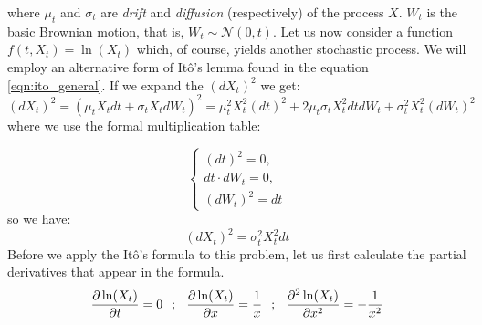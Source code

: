 \documentclass[times, utf8, diplomski]{fer}
\begin{document}
\noindent where $\mu_t$ and $\sigma_t$ are \textit{drift} and \textit{diffusion} (respectively) of the process $X$. $W_t$ is the basic Brownian motion, that is, $W_t \sim \mathcal{N}(0,t)$. Let us now consider a function $f(t,X_t) = \ln(X_t)$ which, of course, yields another stochastic process. We will employ an alternative form of It\^{o}'s lemma found in the equation \ref{eqn:ito_general}. If we expand the $(dX_t)^2$ we get: 
\begin{equation}
	(dX_t)^2 = (\mu_t X_t dt + \sigma_t X_t dW_t)^2 = \mu_t^2 X_t^2 (dt)^2 + 2\mu_t\sigma_tX_t^2dtdW_t + \sigma_t^2X_t^2(dW_t)^2
\end{equation}
where we use the formal multiplication table: 

\begin{equation} 
	\left\{ \begin{array}{c} (dt)^2 = 0, \\ dt\cdot dW_t = 0, \\ (dW_t)^2 = dt \end{array} \right. 
\end{equation} so we have: 
\begin{equation}
	(dX_t)^2 = \sigma_t^2X_t^2dt
\end{equation}
Before we apply the It\^{o}'s formula to this problem, let us first calculate the partial derivatives that appear in the formula. 
\begin{equation}
	\frac{\partial \ln(X_t)}{\partial t} = 0 \hspace{0.25cm} ; \hspace{0.25cm} \frac{\partial \ln(X_t)}{\partial x} = \frac{1}{x} \hspace{0.25cm} ; \hspace{0.25cm} \frac{\partial^2 \ln(X_t)}{\partial x^2} = -\frac{1}{x^2}
\end{equation}
\end{document}
